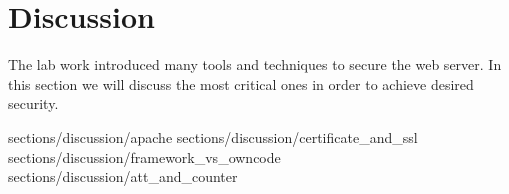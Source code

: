 \section {Discussion}

The lab work introduced many tools and techniques to secure the web server. In this section we will discuss the most critical ones in order to achieve desired security. 


 {sections/discussion/apache}
 {sections/discussion/certificate_and_ssl}
 {sections/discussion/framework_vs_owncode} %
 {sections/discussion/att_and_counter} %

